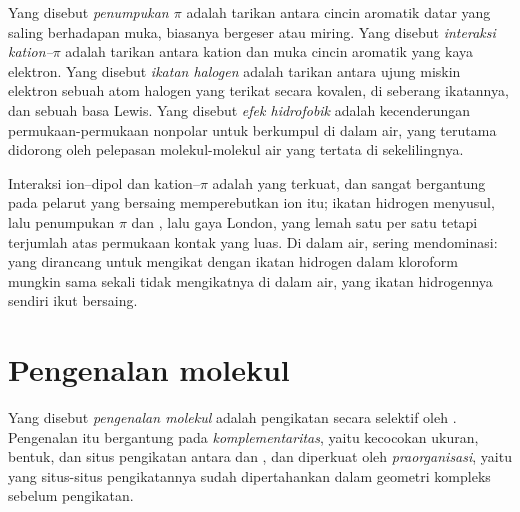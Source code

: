 \begin{definition}\label{def:b3:supramolecular:interactions}
Yang disebut \emph{penumpukan $\pi$} adalah tarikan antara cincin aromatik datar
yang saling berhadapan muka, biasanya bergeser atau miring. Yang disebut \emph{interaksi
kation--$\pi$} adalah tarikan antara kation dan
muka cincin aromatik yang kaya elektron. Yang disebut \emph{ikatan halogen}
adalah tarikan antara ujung miskin elektron sebuah atom halogen yang terikat secara kovalen,
di seberang ikatannya, dan sebuah basa Lewis. Yang disebut \emph{efek
hidrofobik} adalah kecenderungan permukaan-permukaan nonpolar untuk
berkumpul di dalam air, yang terutama didorong oleh pelepasan molekul-molekul air yang tertata
di sekelilingnya.
\end{definition}

Interaksi ion--dipol dan kation--$\pi$ adalah yang terkuat, dan sangat bergantung
pada pelarut yang bersaing memperebutkan ion itu; ikatan hidrogen menyusul,
lalu penumpukan $\pi$ dan , lalu gaya London, yang lemah satu per satu tetapi
terjumlah atas permukaan kontak yang luas. Di dalam air,  sering
mendominasi:  yang dirancang untuk mengikat  dengan ikatan hidrogen dalam kloroform mungkin sama sekali tidak
mengikatnya di dalam air, yang ikatan hidrogennya sendiri ikut bersaing.

\section{Pengenalan molekul}

\begin{definition}\label{def:b3:supramolecular:recognition}
Yang disebut \emph{pengenalan molekul} adalah pengikatan
 secara selektif oleh . Pengenalan itu bergantung pada \emph{komplementaritas},
yaitu kecocokan ukuran, bentuk, dan situs pengikatan antara  dan , dan
diperkuat oleh \emph{praorganisasi}, yaitu  yang situs-situs
pengikatannya sudah dipertahankan dalam geometri kompleks sebelum pengikatan.
\end{definition}

